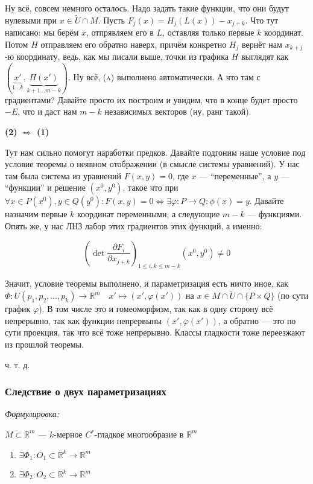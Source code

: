 \documentclass{article}
\begin{document}
Ну всё, совсем немного осталось. Надо задать такие функции, что они будут нулевыми при $x \in \widetilde{U} \cap M$. Пусть $F_j(x) = H_j(L(x)) - x_{j + k}$. Что тут написано: мы берём $x$, отпрявляем его в $L$, оставляя только первые $k$ координат. Потом $H$ отправляем его обратно наверх, причём конкретно $H_j$ вернёт нам $x_{k + j}$-ю координату, ведь, как мы писали выше, точки из графика $H$ выглядят как $(\underbrace{x'}_{1 \ldots k}, \underbrace{H(x')}_{k + 1 \ldots m - k})$. Ну всё, \textsc{(a)} выполнено автоматически. А что там с градиентами? Давайте просто их построим и увидим, что в конце будет просто $-E$, что и даст нам $m - k$ независимых векторов (ну, ранг такой).

\textbf{(2) $\Rightarrow$ (1)}

Тут нам сильно помогут наработки предков. Давайте подгоним наше условие под условие теоремы о неявном отображении (в смысле системы уравнений). У нас там была система из уравнений $F(x, y) = 0$, где $x$ --- ``переменные'', а $y$ --- ``функции'' и решение $(x^0, y^0)$, такое что при $\forall x \in P(x^0), y \in Q(y^0): F(x, y) = 0 \Leftrightarrow \exists \varphi: P \rightarrow Q: \phi(x) = y$. Давайте назначим первые $k$ координат переменными, а следующие $m - k$ --- функциями. Опять же, у нас ЛНЗ лабор этих градиентов этих функций, а именно: 

\[\left(\det \frac{\partial F_i}{\partial x_{j + k}}\right)_{1 \le i, k \le m - k}(x^0, y^0) \neq 0\]

Значит, условие теоремы выполнено, и параметризация есть ничто иное, как $\Phi: U(p_1, p_2, \ldots, p_k) \rightarrow \mathbb{R}^m \quad x' \mapsto (x', \varphi(x'))$ на $x \in M \cap \widetilde{U} \cap \{P \times Q\}$ (по сути график $\varphi$). В том числе это и гомеоморфизм, так как в одну сторону всё непрерывно, так как функции непрервыны $(x', \varphi(x'))$, а обратно --- это по сути проекция, так что всё тоже непрерывно. Классы гладкости тоже переезжают из прошлой теоремы.

ч. т. д.

\subsubsection{Следствие о двух параметризациях}
\textit{Формулировка:}

$M \subset \mathbb{R}^m$ --- $k$-мерное $C^r$-гладкое многообразие в $\mathbb{R}^m$

\begin{enumerate}
    \item $\exists \Phi_1: O_1 \subset \mathbb{R}^k \rightarrow \mathbb{R}^m$
    \item $\exists \Phi_2: O_2 \subset \mathbb{R}^k \rightarrow \mathbb{R}^m$
\end{enumerate}
\end{document}
